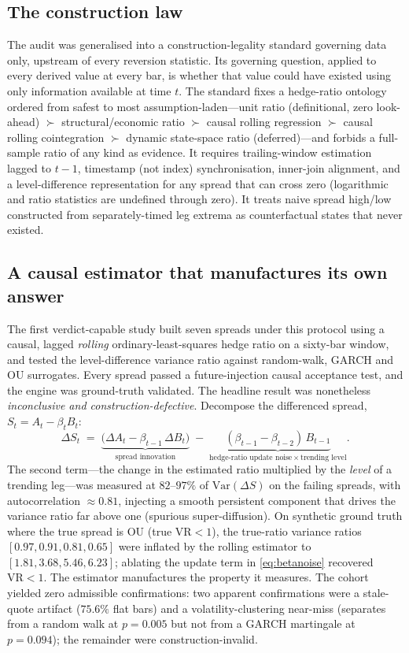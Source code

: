\documentclass[11pt,a4paper]{article}
\newcommand{\VR}{\mathrm{VR}}
\begin{document}
\subsection{The construction law}

The audit was generalised into a construction-legality standard governing data only, upstream of every
reversion statistic. Its governing question, applied to every derived value at every bar, is whether
that value could have existed using only information available at time $t$. The standard fixes a
hedge-ratio ontology ordered from safest to most assumption-laden---unit ratio (definitional,
zero look-ahead) $\succ$ structural/economic ratio $\succ$ causal rolling regression $\succ$ causal
rolling cointegration $\succ$ dynamic state-space ratio (deferred)---and forbids a full-sample ratio of
any kind as evidence. It requires trailing-window estimation lagged to $t-1$, timestamp (not index)
synchronisation, inner-join alignment, and a level-difference representation for any spread that can
cross zero (logarithmic and ratio statistics are undefined through zero). It treats naive spread
high/low constructed from separately-timed leg extrema as counterfactual states that never existed.

\subsection{A causal estimator that manufactures its own answer}

The first verdict-capable study built seven spreads under this protocol using a causal, lagged
\emph{rolling} ordinary-least-squares hedge ratio on a sixty-bar window, and tested the level-difference
variance ratio against random-walk, GARCH and OU surrogates. Every spread passed a future-injection
causal acceptance test, and the engine was ground-truth validated. The headline result was
nonetheless \emph{inconclusive and construction-defective}. Decompose the differenced spread,
$S_t = A_t - \beta_t B_t$:
\begin{equation}
\Delta S_t \;=\; \underbrace{\big(\Delta A_t - \beta_{t-1}\,\Delta B_t\big)}_{\text{spread innovation}}
\;-\; \underbrace{(\beta_{t-1}-\beta_{t-2})\,B_{t-1}}_{\text{hedge-ratio update noise}\,\times\,\text{trending level}}.
\label{eq:betanoise}
\end{equation}
The second term---the change in the estimated ratio multiplied by the \emph{level} of a trending
leg---was measured at $82$--$97\%$ of $\mathrm{Var}(\Delta S)$ on the failing spreads, with
autocorrelation $\approx 0.81$, injecting a smooth persistent component that drives the variance ratio
far above one (spurious super-diffusion). On synthetic ground truth where the true spread is OU (true
$\VR<1$), the true-ratio variance ratios $[0.97,0.91,0.81,0.65]$ were inflated by the rolling estimator
to $[1.81,3.68,5.46,6.23]$; ablating the update term in \eqref{eq:betanoise} recovered $\VR<1$. The
estimator manufactures the property it measures. The cohort yielded zero admissible confirmations: two
apparent confirmations were a stale-quote artifact ($75.6\%$ flat bars) and a volatility-clustering
near-miss (separates from a random walk at $p=0.005$ but not from a GARCH martingale at $p=0.094$); the
remainder were construction-invalid.
\end{document}
